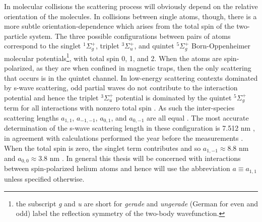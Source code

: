 	In molecular collisions the scattering process will obviously depend on the relative orientation of the molecules.
	In collisions between single atoms, though, there is a more subtle orientation-dependence which arises from the total spin of the two-particle system.
	The three possible configurations between pairs of \mhe atoms correspond to the singlet $^1\Sigma_g^+$, triplet $^3\Sigma_u^+$, and quintet $^5\Sigma_g^+$ Born-Oppenheimer molecular potentials\footnote{the subscript \emph{g} and \emph{u} are short for \emph{gerade} and \emph{ungerade} (German for even and odd) label the reflection symmetry of the two-body wavefunction.}, with total spin 0, 1, and 2.
	When the atoms are spin-polarized, as they are when confined in magnetic traps, then the only scattering that occurs is in the quintet channel.
	In low-energy scattering contexts dominated by s-wave scattering, odd partial waves do not contribute to the interaction potential and hence the triplet $^3\Sigma_u^+$ potential is dominated by the quintet $^5\Sigma_g^+$ term for all interactions with nonzero total spin \cite{Leo01}. 
	As such the inter-species scattering lengths $a_{1,1}$, $a_{-1,-1}$, $a_{0,1}$, and $a_{0,-1}$ are all equal \cite{Leo01,Vassen16}.
	The most accurate determination of the s-wave scattering length in these configuration is 7.512 nm \cite{Moal06}, in agreement with calculations performed the year before the measurements \cite{Przybytek05}.
	When the total spin is zero, the singlet term contributes and so $a_{1,-1}\approx8.8$ nm and $a_{0,0}\approx3.8$ nm \cite{Leo01,Vassen16}.
	In general this thesis will be concerned with interactions between spin-polarized helium atoms and hence will use the abbreviation $a\equiv a_{1,1}$ unless specified otherwise.
	


